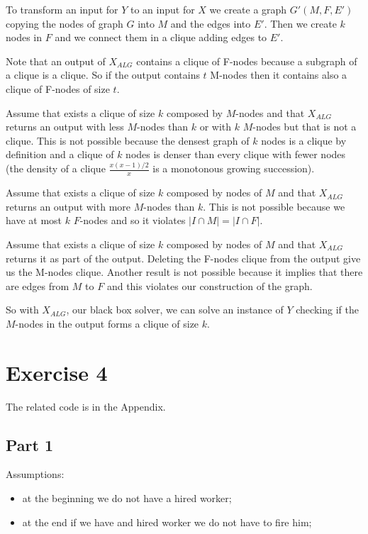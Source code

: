 \documentclass[paper=a4, fontsize=11pt]{scrartcl} %
\numberwithin{equation}{section} %
\numberwithin{figure}{section} %
\numberwithin{table}{section} %
\begin{document}
To transform an input for $Y$ to an input for $X$ we create a graph $G'(M, F, E')$ copying the nodes of graph $G$ into $M$ and the edges into $E'$. Then we create $k$ nodes in $F$ and we connect them in a clique adding edges to $E'$.

Note that an output of $X_{ALG}$ contains a clique of F-nodes because a subgraph of a clique is a clique. So if the output contains $t$ M-nodes then it contains also a clique of F-nodes of size $t$.

Assume that exists a clique of size $k$ composed by $M$-nodes and that $X_{ALG}$ returns an output with less $M$-nodes than $k$ or with $k$ $M$-nodes but that is not a clique.
This is not possible because the densest graph of $k$ nodes is a clique by definition and a clique of $k$ nodes is denser than every clique with fewer nodes (the density of a clique $\frac{x(x-1)/2}{x}$ is a monotonous growing succession).

Assume that exists a clique of size $k$ composed by nodes of $M$ and that $X_{ALG}$ returns an output with more $M$-nodes than $k$.
This is not possible because we have at most $k$ $F$-nodes and so it violates $|I \cap M| = |I \cap F|$.

Assume that exists a clique of size $k$ composed by nodes of $M$ and that $X_{ALG}$ returns it as part of the output.
Deleting the F-nodes clique from the output give us the M-nodes clique.
Another result is not possible because it implies that there are edges from $M$ to $F$ and this violates our construction of the graph.

So with $X_{ALG}$, our black box solver, we can solve an instance of $Y$ checking if the $M$-nodes in the output forms a clique of size $k$.

\bigskip
\section*{Exercise 4}

The related code is in the Appendix.

\subsection*{Part 1}

Assumptions:
\begin{itemize}
    \item at the beginning we do not have a hired worker;
    \item at the end if we have and hired worker we do not have to fire him;
\end{itemize}
\end{document}
